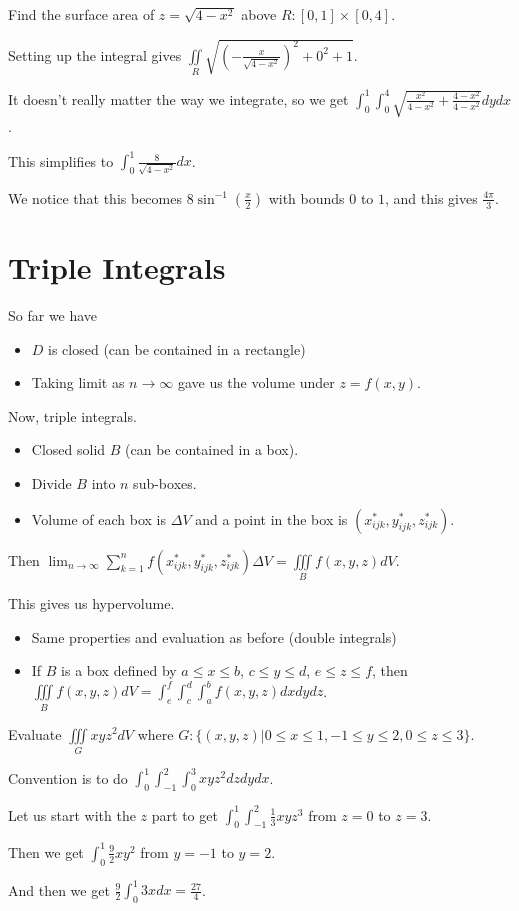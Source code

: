 \documentclass[../calc3.tex]{subfiles}
\begin{document}
\begin{example}
    Find the surface area of $z=\sqrt{4-x^2}$ above $R: [0,1]\times [0,4]$.

    Setting up the integral gives $\iint\limits_{R} \sqrt{\left(-\frac{x}{\sqrt{4-x^2}}\right)^2+0^2+1}$.

    It doesn't really matter the way we integrate, so we get $\int_0^1 \int_0^4 \sqrt{\frac{x^2}{4-x^2}+\frac{4-x^2}{4-x^2}}dydx$.

    This simplifies to $\int_0^1 \frac{8}{\sqrt{4-x^2}}dx$.

    We notice that this becomes $8\sin^{-1}\left(\frac{x}{2}\right)$ with bounds $0$ to $1$, and this gives $\frac{4\pi}{3}$.
\end{example}

\section{Triple Integrals}
So far we have 
\begin{itemize}
    \item $D$ is closed (can be contained in a rectangle)
    \item Taking limit as $n\rightarrow \infty$ gave us the volume under $z=f(x,y)$.
\end{itemize}

Now, triple integrals.
\begin{itemize}
    \item Closed solid $B$ (can be contained in a box).
    \item Divide $B$ into $n$ sub-boxes.
    \item Volume of each box is $\Delta V$ and a point in the box is $(x_{ijk}^*, y_{ijk}^*, z_{ijk}^*)$.
\end{itemize}

Then $\lim_{n\to\infty}\sum_{k=1}^n f\left(x_{ijk}^*, y_{ijk}^*, z_{ijk}^*\right)\Delta V = \iiint\limits_{B} f(x,y,z)dV$.

This gives us hypervolume.
\begin{itemize}
    \item Same properties and evaluation as before (double integrals)
    \item If $B$ is a box defined by $a\leq x\leq b$, $c\leq y\leq d$, $e\leq z\leq f$, then $\iiint\limits_{B} f(x,y,z)dV = \int_e^f \int_c^d \int_a^b f(x,y,z)dxdydz$.
\end{itemize}

\begin{example}
    Evaluate $\iiint\limits_{G} xyz^2 dV$ where $G: \{ (x,y,z)|0\leq x\leq 1,-1\leq y\leq 2, 0\leq z\leq 3\}$.

    Convention is to do $\int_0^1 \int_{-1}^2 \int_0^3 xyz^2 dz dy dx$.

    Let us start with the $z$ part to get $\int_0^1 \int_{-1}^2 \frac{1}{3}xyz^3$ from $z=0$ to $z=3$.

    Then we get $\int_0^1 \frac{9}{2}xy^2$ from $y=-1$ to $y=2$.

    And then we get $\frac{9}{2}\int_0^1 3x dx = \frac{27}{4}$.
\end{example}
\end{document}
